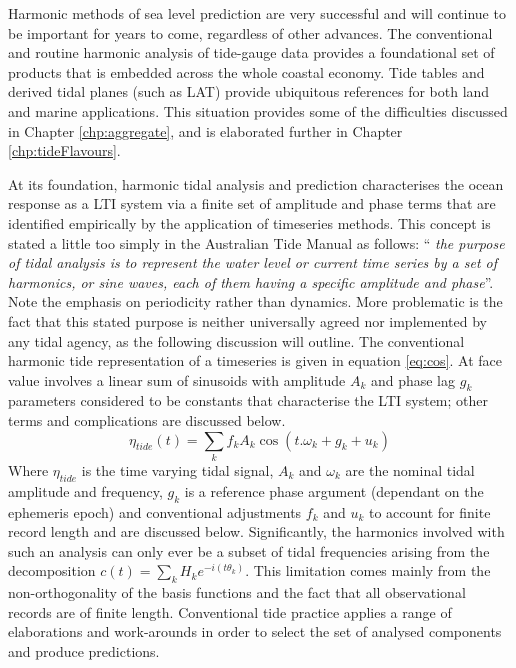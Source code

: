 Harmonic methods of sea level prediction are very successful and will continue to be important for years to come, regardless of other advances.  The conventional and routine harmonic analysis of tide-gauge data provides a foundational set of products that is embedded across the whole coastal economy. Tide tables and derived tidal planes (such as LAT) provide ubiquitous references for both land and marine applications. This situation provides some of the difficulties discussed in Chapter \ref{chp:aggregate}, and is elaborated further in  Chapter \ref{chp:tideFlavours}.


At its foundation, harmonic tidal analysis and prediction characterises the ocean response as a LTI system via a finite set of amplitude and phase terms that are identified empirically by the application of timeseries methods.   This concept is stated a little too simply in the Australian Tide Manual as follows: ``\textit{ the purpose of tidal analysis is to represent the water level or current time series by a set of harmonics, or sine waves, each of them having a specific amplitude and phase}''\citep{PCTMSL-sp9}.
Note the emphasis on periodicity rather than dynamics.  More problematic is the fact that this stated purpose is neither universally agreed nor implemented by any tidal agency, as the following discussion will outline.  
The conventional harmonic tide representation of a timeseries is given in equation \ref{eq:cos}.  At face value involves a linear sum of sinusoids with amplitude $A_k$ and phase lag $g_k$ parameters considered to be constants that characterise the LTI system; other terms and complications are discussed below.  
\begin{equation}
    \eta_{tide}(t) = \sum_{k} f_k A_k \cos ( t.\omega_k + g_k + u_k)
    \label{eq:cos}
\end{equation}
Where $\eta_{tide}$ is the time varying tidal signal, $A_k$ and $\omega_k$ are the nominal tidal amplitude and frequency, $g_k$ is a reference phase argument (dependant on the ephemeris epoch) and conventional adjustments $f_k$ and $u_k$ to account for finite record length and are discussed below. 
Significantly, the harmonics involved with such an analysis can only ever be a subset of tidal frequencies arising from the decomposition $c(t) = \sum_{k} H_{k} e^{-i( t\theta_{k})}$.  This limitation comes mainly from the non-orthogonality of the basis functions and the fact that all observational records are of finite length.
Conventional tide practice applies a range of elaborations and work-arounds in order to select the set of analysed components and produce predictions.  
